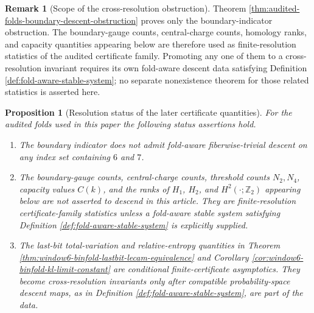 \documentclass[12pt,a4paper]{article}
\theoremstyle{plain}
\newtheorem{proposition}[theorem]{Proposition}
\theoremstyle{definition}
\newtheorem{remark}[theorem]{Remark}
\numberwithin{equation}{section}
\newcommand{\ZZ}{\mathbb{Z}}
\begin{document}
\begin{remark}[Scope of the cross-resolution obstruction]\label{rem:cross-resolution-statistics-warning}
Theorem \ref{thm:audited-folds-boundary-descent-obstruction} proves only the boundary-indicator obstruction.  The boundary-gauge counts, central-charge counts, homology ranks, and capacity quantities appearing below are therefore used as finite-resolution statistics of the audited certificate family.  Promoting any one of them to a cross-resolution invariant requires its own fold-aware descent data satisfying Definition \ref{def:fold-aware-stable-system}; no separate nonexistence theorem for those related statistics is asserted here.
\end{remark}

\begin{proposition}[Resolution status of the later certificate quantities]\label{prop:cross-resolution-quantity-status}
For the audited folds used in this paper the following status assertions hold.
\begin{enumerate}[label=\textup{(\roman*)}]
\item The boundary indicator does not admit fold-aware fiberwise-trivial descent on any index set containing \(6\) and \(7\).
\item The boundary-gauge counts, central-charge counts, threshold counts \(N_2,N_4\), capacity values \(C(k)\), and the ranks of \(H_1\), \(H_2\), and \(H^2(\cdot;\ZZ_2)\) appearing below are not asserted to descend in this article.  They are finite-resolution certificate-family statistics unless a fold-aware stable system satisfying Definition \ref{def:fold-aware-stable-system} is explicitly supplied.
\item The last-bit total-variation and relative-entropy quantities in Theorem \ref{thm:window6-binfold-lastbit-lecam-equivalence} and Corollary \ref{cor:window6-binfold-kl-limit-constant} are conditional finite-certificate asymptotics.  They become cross-resolution invariants only after compatible probability-space descent maps, as in Definition \ref{def:fold-aware-stable-system}, are part of the data.
\end{enumerate}
\end{proposition}
\end{document}
